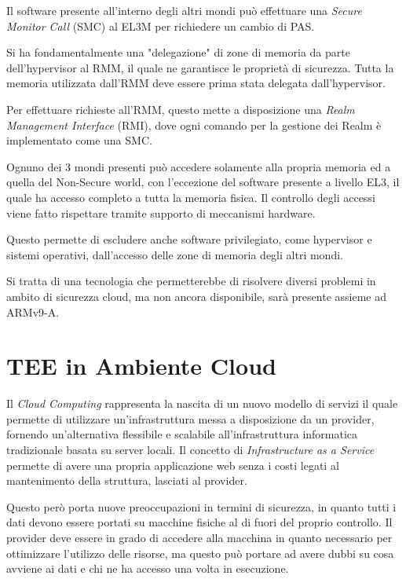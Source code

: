 \documentclass[12pt,italian]{report}
\begin{document}
	Il software presente all'interno degli altri mondi può effettuare una \textit{Secure Monitor Call} (SMC) al EL3M per richiedere un cambio di PAS.
	
	\bigbreak
	
	Si ha fondamentalmente una "delegazione" di zone di memoria da parte dell'hypervisor al RMM, il quale ne garantisce le proprietà di sicurezza. Tutta la memoria utilizzata dall'RMM deve essere prima stata delegata dall'hypervisor.
	
	Per effettuare richieste all'RMM, questo mette a disposizione una \textit{Realm Management Interface} (RMI), dove ogni comando per la gestione dei Realm è implementato come una SMC.
	
	\bigbreak
	
	Ognuno dei 3 mondi presenti può accedere solamente alla propria memoria ed a quella del Non-Secure world, con l'eccezione del software presente a livello EL3, il quale ha accesso completo a tutta la memoria fisica. Il controllo degli accessi viene fatto rispettare tramite supporto di meccanismi hardware.
	
	Questo permette di escludere anche software privilegiato, come hypervisor e sistemi operativi, dall'accesso delle zone di memoria degli altri mondi.
	
	\bigbreak
	
	Si tratta di una tecnologia che permetterebbe di risolvere diversi problemi in ambito di sicurezza cloud, ma non ancora disponibile, sarà presente assieme ad ARMv9-A.
	
	\chapter{TEE in Ambiente Cloud}
	\label{cap:problema}
	Il \textit{Cloud Computing} rappresenta la nascita di un nuovo modello di servizi il quale permette di utilizzare un'infrastruttura messa a disposizione da un provider, fornendo un'alternativa flessibile e scalabile all'infrastruttura informatica tradizionale basata su server locali. Il concetto di \textit{Infrastructure as a Service} permette di avere una propria applicazione web senza i costi legati al mantenimento della struttura, lasciati al provider.
	
	\bigbreak
	
	Questo però porta nuove preoccupazioni in termini di sicurezza, in quanto tutti i dati devono essere portati su macchine fisiche al di fuori del proprio controllo. Il provider deve essere in grado di accedere alla macchina in quanto necessario per ottimizzare l'utilizzo delle risorse, ma questo può portare ad avere dubbi su cosa avviene ai dati e chi ne ha accesso una volta in esecuzione.
	
\end{document}
